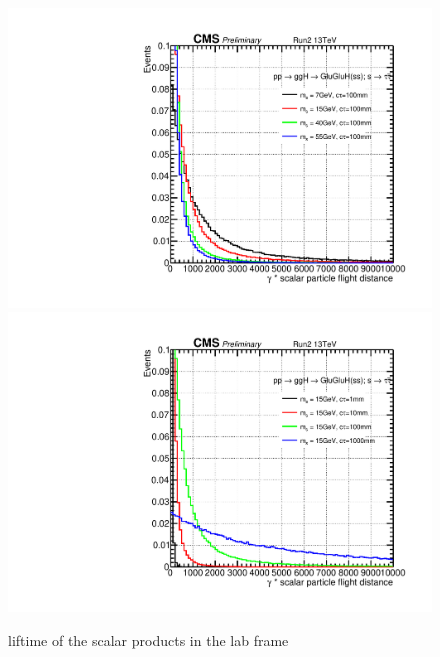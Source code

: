 \begin{figure}[h!]
  \caption{liftime of the scalar products in the lab frame}
  \label{fig:scalarpt}
  \centering
  \includegraphics[width=0.57\linewidth]{figs/Scalar_gammactau100mm.pdf}
  \includegraphics[width=0.57\linewidth]{figs/Scalar_gammactau15GeV.pdf}
\end{figure}

